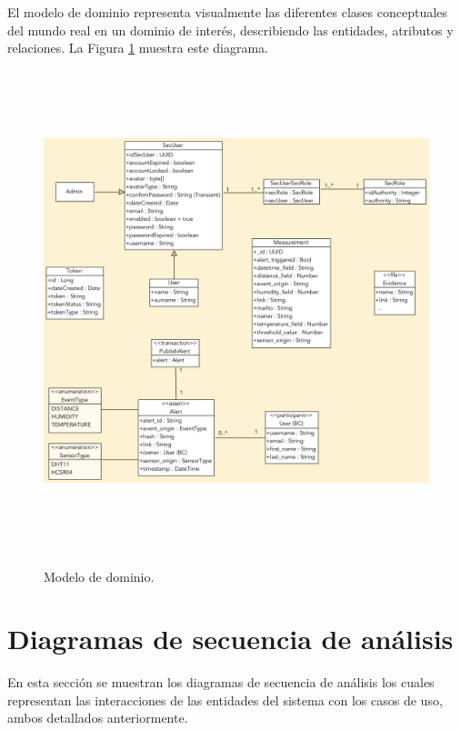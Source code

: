 \documentclass[12pt,a4paper, twoside]{report}
\begin{document}
	El modelo de dominio representa visualmente las diferentes clases conceptuales del mundo real en un dominio de interés, describiendo las entidades, atributos y relaciones. La Figura \ref{fig:domain_model} muestra este diagrama.
	
	\begin{figure}[!ht]   
		\caption{Modelo de dominio.} 
		\begin{center} 
	 		\includegraphics[width=17cm,height=14cm]{Images/analysis/classDiagram} \\
			\label{fig:domain_model} 
		\end{center}  
	\end{figure}  
	
	\section{Diagramas de secuencia de análisis}
		
	En esta sección se muestran los diagramas de secuencia de análisis los cuales representan las interacciones de las entidades del sistema con los casos de uso, ambos detallados anteriormente.
			
	\newpage
			
\end{document}
